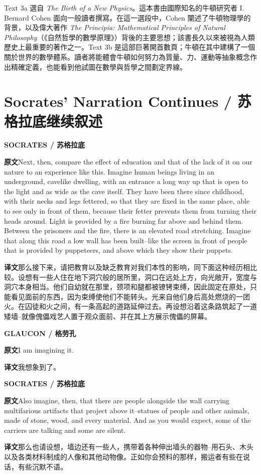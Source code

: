 \documentclass[UTF8,zihao=-4]{ctexart}
\newcommand{\BodyFont}{\fontsize{10.5pt}{15.5pt}\selectfont}
\newcommand{\origlabel}{\textbf{原文}\quad}
\newcommand{\translabel}{\textbf{译文}\quad}
\newenvironment{enblock}{\par\noindent\begingroup\BodyFont\origlabel}{\par\endgroup}
\newenvironment{zhblock}{\par\noindent\begingroup\BodyFont\translabel}{\par\endgroup\vspace{0.35em}}
\newcommand{\en}[1]{\begin{enblock}#1\end{enblock}}
\newcommand{\zh}[1]{\begin{zhblock}#1\end{zhblock}}
\newcommand{\speaker}[2]{\par\medskip\noindent\textbf{#1 / #2}\par}
\begin{document}
\noindent Text 3a 選自 \textit{The Birth of a New Physics}。這本書由國際知名的牛頓研究者 I. Bernard Cohen 面向一般讀者撰寫。在這一選段中，Cohen 闡述了牛頓物理學的背景，以及偉大著作 \textit{The Principia: Mathematical Principles of Natural Philosophy}（《自然哲學的數學原理》）背後的主要思想；該書長久以來被視為人類歷史上最重要的著作之一。Text 3b 是這部巨著開首數頁；牛頓在其中建構了一個關於世界的數學體系。讀者將能體會牛頓如何努力為質量、力、運動等抽象概念作出精確定義，也能看到他試圖在數學與哲學之間劃定界線。


\section*{Socrates' Narration Continues / 苏格拉底继续叙述}

\speaker{SOCRATES}{苏格拉底}
\en{Next, then, compare the effect of education and that of the lack of it on our nature to an experience like this. Imagine human beings living in an underground, cavelike dwelling, with an entrance a long way up that is open to the light and as wide as the cave itself. They have been there since childhood, with their necks and legs fettered, so that they are fixed in the same place, able to see only in front of them, because their fetter prevents them from turning their heads around. Light is provided by a fire burning far above and behind them. Between the prisoners and the fire, there is an elevated road stretching. Imagine that along this road a low wall has been built--like the screen in front of people that is provided by puppeteers, and above which they show their puppets.}
\zh{那么接下来，请把教育以及缺乏教育对我们本性的影响，同下面这种经历相比较。设想有一些人住在地下洞穴般的居所里，洞口在远处上方，向光敞开，宽度与洞穴本身相当。他们自幼就在那里，颈项和腿都被镣铐束缚，因此固定在原处，只能看见面前的东西，因为束缚使他们不能转头。光来自他们身后高处燃烧的一团火。在囚徒和火之间，有一条高起的道路延伸过去。再设想沿着这条路筑起了一道矮墙--就像傀儡戏艺人置于观众面前、并在其上方展示傀儡的屏幕。}

\speaker{GLAUCON}{格劳孔}
\en{I am imagining it.}
\zh{我想象到了。}

\speaker{SOCRATES}{苏格拉底}
\en{Also imagine, then, that there are people alongside the wall carrying multifarious artifacts that project above it--statues of people and other animals, made of stone, wood, and every material. And as you would expect, some of the carriers are talking and some are silent.}
\zh{那么也请设想，墙边还有一些人，携带着各种伸出墙头的器物--用石头、木头以及各类材料制成的人像和其他动物像。正如你会预料的那样，搬运者有些在说话，有些沉默不语。}
\end{document}
